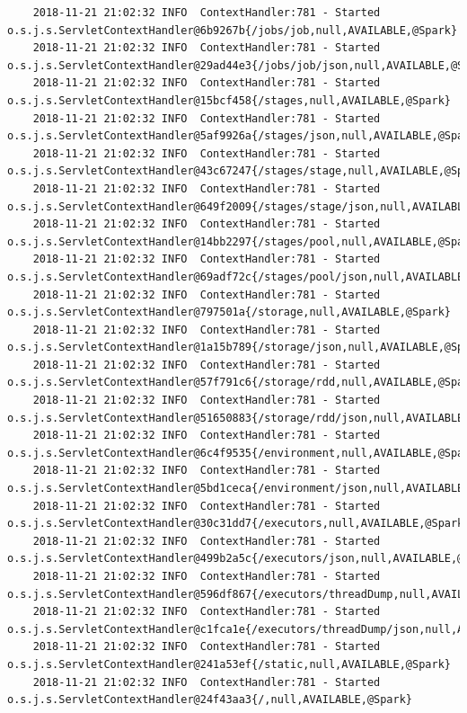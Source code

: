 \documentclass[11pt, letterpaper]{article}
\begin{document}
\begin{lstlisting}
	2018-11-21 21:02:32 INFO  ContextHandler:781 - Started o.s.j.s.ServletContextHandler@6b9267b{/jobs/job,null,AVAILABLE,@Spark}
	2018-11-21 21:02:32 INFO  ContextHandler:781 - Started o.s.j.s.ServletContextHandler@29ad44e3{/jobs/job/json,null,AVAILABLE,@Spark}
	2018-11-21 21:02:32 INFO  ContextHandler:781 - Started o.s.j.s.ServletContextHandler@15bcf458{/stages,null,AVAILABLE,@Spark}
	2018-11-21 21:02:32 INFO  ContextHandler:781 - Started o.s.j.s.ServletContextHandler@5af9926a{/stages/json,null,AVAILABLE,@Spark}
	2018-11-21 21:02:32 INFO  ContextHandler:781 - Started o.s.j.s.ServletContextHandler@43c67247{/stages/stage,null,AVAILABLE,@Spark}
	2018-11-21 21:02:32 INFO  ContextHandler:781 - Started o.s.j.s.ServletContextHandler@649f2009{/stages/stage/json,null,AVAILABLE,@Spark}
	2018-11-21 21:02:32 INFO  ContextHandler:781 - Started o.s.j.s.ServletContextHandler@14bb2297{/stages/pool,null,AVAILABLE,@Spark}
	2018-11-21 21:02:32 INFO  ContextHandler:781 - Started o.s.j.s.ServletContextHandler@69adf72c{/stages/pool/json,null,AVAILABLE,@Spark}
	2018-11-21 21:02:32 INFO  ContextHandler:781 - Started o.s.j.s.ServletContextHandler@797501a{/storage,null,AVAILABLE,@Spark}
	2018-11-21 21:02:32 INFO  ContextHandler:781 - Started o.s.j.s.ServletContextHandler@1a15b789{/storage/json,null,AVAILABLE,@Spark}
	2018-11-21 21:02:32 INFO  ContextHandler:781 - Started o.s.j.s.ServletContextHandler@57f791c6{/storage/rdd,null,AVAILABLE,@Spark}
	2018-11-21 21:02:32 INFO  ContextHandler:781 - Started o.s.j.s.ServletContextHandler@51650883{/storage/rdd/json,null,AVAILABLE,@Spark}
	2018-11-21 21:02:32 INFO  ContextHandler:781 - Started o.s.j.s.ServletContextHandler@6c4f9535{/environment,null,AVAILABLE,@Spark}
	2018-11-21 21:02:32 INFO  ContextHandler:781 - Started o.s.j.s.ServletContextHandler@5bd1ceca{/environment/json,null,AVAILABLE,@Spark}
	2018-11-21 21:02:32 INFO  ContextHandler:781 - Started o.s.j.s.ServletContextHandler@30c31dd7{/executors,null,AVAILABLE,@Spark}
	2018-11-21 21:02:32 INFO  ContextHandler:781 - Started o.s.j.s.ServletContextHandler@499b2a5c{/executors/json,null,AVAILABLE,@Spark}
	2018-11-21 21:02:32 INFO  ContextHandler:781 - Started o.s.j.s.ServletContextHandler@596df867{/executors/threadDump,null,AVAILABLE,@Spark}
	2018-11-21 21:02:32 INFO  ContextHandler:781 - Started o.s.j.s.ServletContextHandler@c1fca1e{/executors/threadDump/json,null,AVAILABLE,@Spark}
	2018-11-21 21:02:32 INFO  ContextHandler:781 - Started o.s.j.s.ServletContextHandler@241a53ef{/static,null,AVAILABLE,@Spark}
	2018-11-21 21:02:32 INFO  ContextHandler:781 - Started o.s.j.s.ServletContextHandler@24f43aa3{/,null,AVAILABLE,@Spark}

\end{lstlisting}
\end{document}
